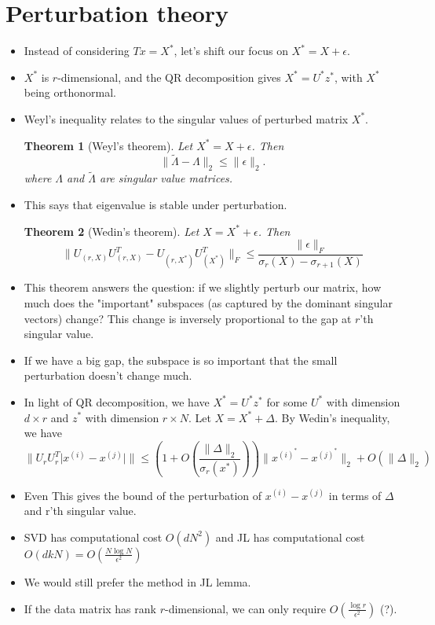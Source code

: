 \documentclass[11pt,reqno]{amsart}
\newtheorem{theorem}{Theorem}
\theoremstyle{remark}
\begin{document}
\begin{sloppypar}
\section{Perturbation theory}
\begin{itemize}
\item Instead of considering $Tx=X^*$, let's shift our focus on $X^* = X+\epsilon$.
\item $X^*$ is $r$-dimensional, and the QR decomposition gives $X^*=U^*z^*$, with 
$X^*$ being orthonormal.
\item Weyl's inequality relates to the singular values of perturbed matrix $X^*$.
\begin{theorem}[Weyl's theorem]\label{Theorem:Weyl}
Let $X^*=X+\epsilon$. Then
\[
\lVert \tilde\Lambda-\Lambda\rVert_2\leq\lVert\epsilon\rVert_2.
\]
where $\Lambda$ and $\tilde\Lambda$ are singular value matrices.
\end{theorem}
\item This says that eigenvalue is stable under perturbation. 
\begin{theorem}[Wedin's theorem]
Let $X=X^*+\epsilon$. Then 
\[
\lVert U_{(r,X)} U_{(r,X)}^T-U_{(r,X^*)} U_{(X^*)}^T\rVert_{F}\leq
\frac{\lVert\epsilon\rVert_{F}}{\sigma_r(X)-\sigma_{r+1}(X)}
\]
\end{theorem}
\item This theorem answers the question: if we slightly perturb our matrix, 
how much does the "important" subspaces (as captured by the dominant singular vectors)
 change? This change is inversely proportional to the gap at $r$'th singular value.
\item If we have a big gap, the subspace is so important that the small perturbation doesn't change much.
\item In light of QR decomposition, we have $X^* = U^* z^*$ for some 
$U^*$ with dimension $d\times r$ and $z^*$ with dimension $r\times N$. Let $X=X^*+\Delta$. By Wedin's inequality, we have
\[
\lVert U_r U_r^T \lvert x^{(i)}-x^{(j)}\rvert\rVert\leq (1+O(\frac{\lVert 
  \Delta\rVert_2}{\sigma_r(x^*)}))\lVert x^{(i)^*}
  -x^{(j)^*}\rVert_2+O(\lVert\Delta\rVert_2)
\]
\item Even This gives the bound of the perturbation of $x^{(i)}-x^{(j)}$ in terms 
of $\Delta$ and r'th singular value. 
\item SVD has computational cost $O(dN^2)$ and JL has computational cost 
$O(dkN)=O(\frac{N\log N}{\epsilon^2})$
\item We would still prefer the method in JL lemma.
\item If the data matrix has rank $r$-dimensional, we can only require $O(\frac{\log r}{\epsilon^2})$ (?).

\end{itemize}
\end{sloppypar}
\end{document}
